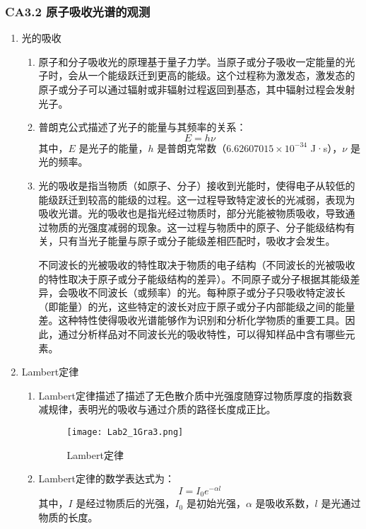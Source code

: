 \documentclass[dvipsnames, svgnames,a4paper,11pt]{article}
\begin{document}
	\subsubsection{CA3.2 原子吸收光谱的观测}
	\begin{enumerate}
		\item 光的吸收
		\begin{enumerate}
			\item 原子和分子吸收光的原理基于量子力学。当原子或分子吸收一定能量的光子时，会从一个能级跃迁到更高的能级。这个过程称为激发态，激发态的原子或分子可以通过辐射或非辐射过程返回到基态，其中辐射过程会发射光子。
			\item 普朗克公式描述了光子的能量与其频率的关系：
			\[ E = h\nu \]
			其中，\(E\) 是光子的能量，\(h\) 是普朗克常数（\(6.62607015 \times 10^{-34}\) J·s），\(\nu\) 是光的频率。
			\item 光的吸收是指当物质（如原子、分子）接收到光能时，使得电子从较低的能级跃迁到较高的能级的过程。这一过程导致特定波长的光减弱，表现为吸收光谱。光的吸收也是指光经过物质时，部分光能被物质吸收，导致通过物质的光强度减弱的现象。这一过程与物质中的原子、分子能级结构有关，只有当光子能量与原子或分子能级差相匹配时，吸收才会发生。
			
			不同波长的光被吸收的特性取决于物质的电子结构（不同波长的光被吸收的特性取决于原子或分子能级结构的差异）。不同原子或分子根据其能级差异，会吸收不同波长（或频率）的光。每种原子或分子只吸收特定波长（即能量）的光，这些特定的波长对应于原子或分子内部能级之间的能量差。这种特性使得吸收光谱能够作为识别和分析化学物质的重要工具。因此，通过分析样品对不同波长光的吸收特性，可以得知样品中含有哪些元素。
		\end{enumerate}
		
		\item Lambert定律
		\begin{enumerate}
			\item Lambert定律描述了描述了无色散介质中光强度随穿过物质厚度的指数衰减规律，表明光的吸收与通过介质的路径长度成正比。
			
			\begin{figure}[htbp]
				\centering
				\texttt{[image: Lab2\_1Gra3.png]}
				\caption{Lambert定律}
				\label{fig:fig3}
			\end{figure}
			
			\item Lambert定律的数学表达式为：
			\[ I = I_0 e^{-\alpha l} \]
			其中，\(I\) 是经过物质后的光强，\(I_0\) 是初始光强，\(\alpha\) 是吸收系数，\(l\) 是光通过物质的长度。
		\end{enumerate}
		

\end{enumerate}
\end{document}
